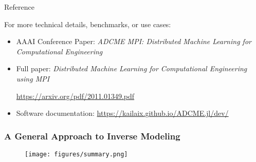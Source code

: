 \documentclass[usenames,dvipsnames]{beamer}
\begin{document}
\begin{frame}{Reference}

For more technical details, benchmarks, or use cases:
\begin{itemize}
\item AAAI Conference Paper: \textit{ADCME MPI: Distributed Machine Learning
for Computational Engineering}
\item Full paper: \textit{Distributed Machine Learning for Computational Engineering using MPI
}

 \url{https://arxiv.org/pdf/2011.01349.pdf}
\item Software documentation: \url{https://kailaix.github.io/ADCME.jl/dev/}
\end{itemize}
\end{frame}

\begin{frame}
	\frametitle{A General Approach to Inverse Modeling}
	\begin{figure}[hbt]
		\texttt{[image: figures/summary.png]}
	\end{figure}
\end{frame}




\end{document}
